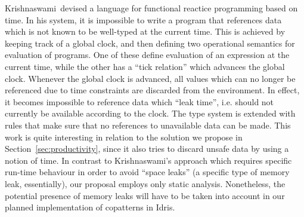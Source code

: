
Krishnaswami\,\citep{Krishnaswami13} devised a language for functional reactice programming based on time. In his system, it is impossible to write a program that references data which is not known to be well-typed at the current time. This is achieved by keeping track of a global clock, and then defining two operational semantics for evaluation of programs. One of these define evaluation of an expression at the current time, while the other has a ``tick relation'' which advances the global clock. Whenever the global clock is advanced, all values which can no longer be referenced due to time constraints are discarded from the environment. In effect, it becomes impossible to reference data which ``leak time'', i.e. should not currently be available according to the clock. The type system is extended with rules that make sure that no references to unavailable data can be made. This work is quite interesting in relation to the solution we propose in Section~\ref{sec:productivity}, since it also tries to discard unsafe data by using a notion of time. In contrast to Krishnaswami's approach which requires specific run-time behaviour in order to avoid ``space leaks'' (a specific type of memory leak, essentially), our proposal employs only static analysis. Nonetheless, the potential presence of memory leaks will have to be taken into account in our planned implementation of copatterns in Idris.

